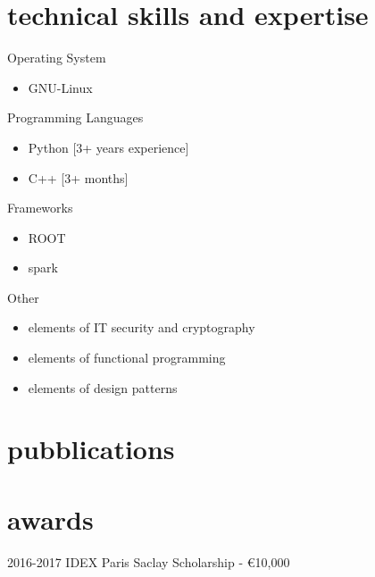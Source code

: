 \documentclass[]{cv-style}     %
\begin{document}
\section{technical skills and expertise}
\par\vspace{.5\parskip}%
 {\color{gray}\headingfont Operating System}
 \begin{itemize}
  \item GNU-Linux
 \end{itemize}
 {\color{gray}\headingfont Programming Languages}
 \begin{itemize}
  \item Python [3+ years experience]
  \item C++ [3+ months]
 \end{itemize}
 {\color{gray}\headingfont Frameworks}
 \begin{itemize}
  \item ROOT
  \item spark
 \end{itemize}
 {\color{gray}\headingfont Other}
 {%
 \begin{itemize}
  \item elements of IT security and cryptography
  \item elements of functional programming
  \item elements of design patterns
 \end{itemize}
 }
 \par\vspace{.5\parskip}
\section{pubblications}
\section{awards}
\par\vspace{.5\parskip}%
\begin{entrylist}
\entry
{2016-2017}
{IDEX Paris Saclay Scholarship - \euro 10,000}
{}
{}
\end{entrylist}
\end{document}
